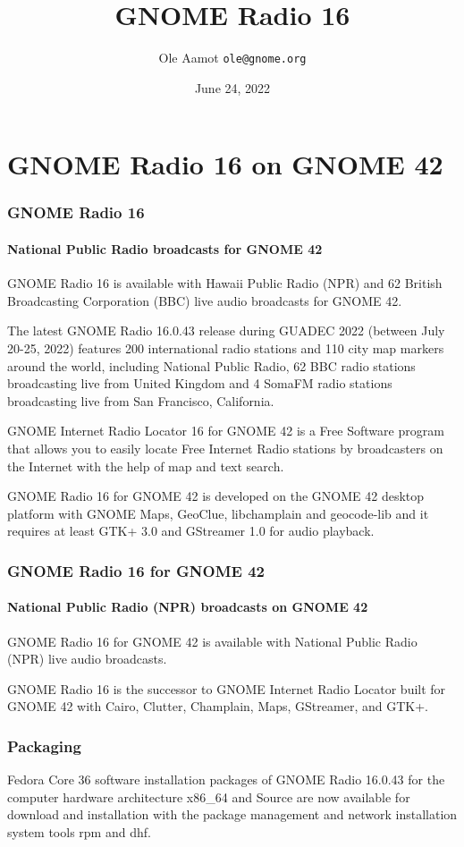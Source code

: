 \documentclass[aspectratio=43]{beamer}
\title[GNOME Radio 16]{GNOME Radio 16}
\author{Ole Aamot \texttt{ole@gnome.org}}
\date{June 24, 2022}
\begin{document}
\begin{frame}
\titlepage
\end{frame}

\section{GNOME Radio 16 on GNOME 42}

\begin{frame}[containsverbatim]
\frametitle{GNOME Radio 16}
\framesubtitle{National Public Radio broadcasts for GNOME 42}

GNOME Radio 16 is available with Hawaii Public Radio (NPR) and 62 British
Broadcasting Corporation (BBC) live audio broadcasts for GNOME 42.

The latest GNOME Radio 16.0.43 release during GUADEC 2022 (between
July 20-25, 2022) features 200 international radio stations and 110 city
map markers around the world, including National Public Radio, 62 BBC radio
stations broadcasting live from United Kingdom and 4 SomaFM radio stations
broadcasting live from San Francisco, California.

GNOME Internet Radio Locator 16 for GNOME 42 is a Free Software program that
allows you to easily locate Free Internet Radio stations by broadcasters on
the Internet with the help of map and text search.

GNOME Radio 16 for GNOME 42 is developed on the GNOME 42 desktop platform
with GNOME Maps, GeoClue, libchamplain and geocode-lib and it requires at
least GTK+ 3.0 and GStreamer 1.0 for audio playback.

\end{frame}

\begin{frame}[containsverbatim]
\frametitle{GNOME Radio 16 for GNOME 42}
\framesubtitle{National Public Radio (NPR) broadcasts on GNOME 42}

GNOME Radio 16 for GNOME 42 is available with National Public Radio
(NPR) live audio broadcasts.

GNOME Radio 16 is the successor to GNOME Internet Radio Locator
built for GNOME 42 with Cairo, Clutter, Champlain, Maps, GStreamer,
and GTK+.

\end{frame}

\begin{frame}
\frametitle{Packaging}

Fedora Core 36 software installation packages of GNOME Radio 16.0.43
for the computer hardware architecture x86\_64 and Source are now
available for download and installation with the package management
and network installation system tools rpm and dhf.

\end{frame}
\end{document}

